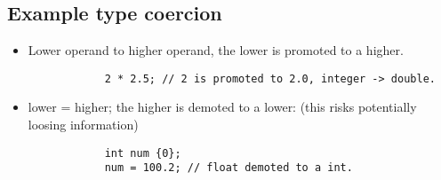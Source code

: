 \subsection{Example type coercion}
\begin{itemize}
    \item Lower operand to higher operand, the lower is promoted to a higher. 
        \begin{verbatim}
            2 * 2.5; // 2 is promoted to 2.0, integer -> double. 
        \end{verbatim}
    
    \item lower = higher; the higher is demoted to a lower: (this risks potentially loosing information)
        \begin{verbatim}
            int num {0}; 
            num = 100.2; // float demoted to a int.
        \end{verbatim}
\end{itemize}


